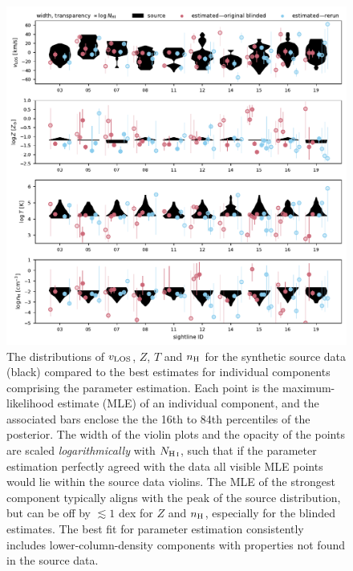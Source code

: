 \documentclass[fleqn,usenatbib]{mnras}
\begin{document}
\begin{figure}
    \centering
    \includegraphics[width=\textwidth]{figures/sample2/violin_vs_components.pdf}
    \caption{
    The distributions of $v_{\rm LOS}$, $Z$, $T$ and $n_{\rm H}$ for the synthetic source data (black) compared to the best estimates for individual components comprising the parameter estimation.
    Each point is the maximum-likelihood estimate (MLE) of an individual component,
    and the associated bars enclose the the 16th to 84th percentiles of the posterior.
    The width of the violin plots and the opacity of the points are scaled \textit{logarithmically} with $N_{\ion{H}{I}}$,
    such that if the parameter estimation perfectly agreed with the data all visible MLE points would lie within the source data violins.
    The MLE of the strongest component typically aligns with the peak of the source distribution, but can be off by $\lesssim 1$ dex for $Z$ and $n_{\rm H}$, especially for the blinded estimates.
    The best fit for parameter estimation consistently includes lower-column-density components with properties not found in the source data.
    }
    \label{f: sample2 violin vs components both}
\end{figure}
\end{document}
